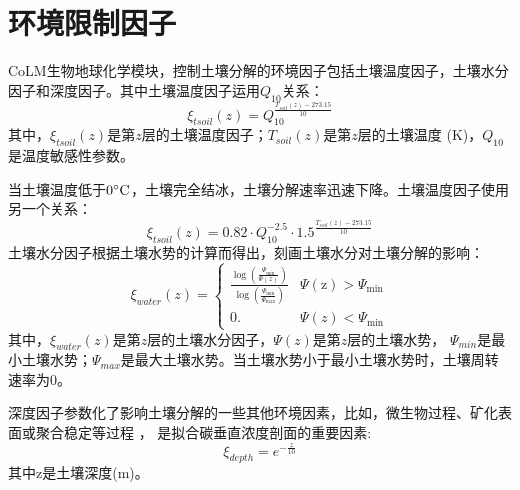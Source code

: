 \section{环境限制因子}\label{环境限制因子}
CoLM生物地球化学模块，控制土壤分解的环境因子包括土壤温度因子，土壤水分因子和深度因子。其中土壤温度因子运用$Q_{10}$关系：
\begin{equation}
\xi_{t s o i l}(z)=Q_{10}^{\frac{T_{{soil }}(z)-273.15}{10}}
\end{equation}
其中，$\xi_{tsoil}\left(z\right)$是第$z$层的土壤温度因子；$T_{soil}\left(z\right)$是第$z$层的土壤温度 (K)，$Q_{10}$是温度敏感性参数。


当土壤温度低于$\rm 0^{\circ}C$，土壤完全结冰，土壤分解速率迅速下降。土壤温度因子使用另一个关系：
\begin{equation}
\xi_{t s o i l}(z)=0.82 \cdot Q_{10}^{-2.5} \cdot 1.5^{\frac{T_{{soil }}(z)-273.15}{10}}
\end{equation}
土壤水分因子根据土壤水势的计算而得出，刻画土壤水分对土壤分解的影响：
\begin{equation}
\xi_{w a t e r}(z)=\left\{\begin{array}{ll}\frac{\log \left(\frac{\Psi_{\min }}{\Psi(z)}\right)}{\log \left(\frac{\Psi_{\min }}{\Psi_{\max }}\right)} 
    & \Psi(\mathrm{z})>\Psi_{\min } \\ 0 . & \Psi(z)<\Psi_{\min }\end{array}\right.
\end{equation}
其中，$\xi_{water}\left(z\right)$是第$z$层的土壤水分因子，$\Psi\left(z\right)$是第$z$层的土壤水势，
$\Psi_{min}$是最小土壤水势；$\Psi_{max}$是最大土壤水势。当土壤水势小于最小土壤水势时，土壤周转速率为0。


深度因子参数化了影响土壤分解的一些其他环境因素，比如，微生物过程、矿化表面或聚合稳定等过程 \citep{koven2013effect}，
是拟合碳垂直浓度剖面的重要因素\citep{jenkinson2008turnover}:
\begin{equation}
\xi_{d e p t h}=e^{-\frac{z}{10}}
\end{equation}
其中z是土壤深度(m)。
